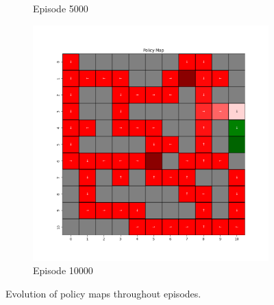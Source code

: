 \documentclass{assignment}
\begin{document}
\begin{figure}[H]
\begin{subfigure}{0.3\textwidth}
    \caption{Episode 5000}
    \end{subfigure}\hfill
    \begin{subfigure}{0.3\textwidth}
        \includegraphics[width=\textwidth]{figures/policy_q/gamma_sweep/policy_alpha_0.1_gamma_0.5_epsilon_0.2_iteration_10000.png}
    \caption{Episode 10000}
    \end{subfigure}
    \caption{Evolution of policy maps throughout episodes.}
    \label{fig:gamma_0.5_q_learning_policy}
\end{figure}
\end{document}
